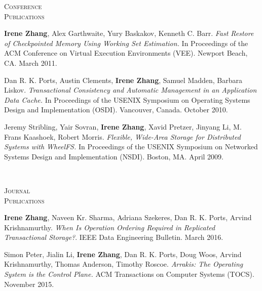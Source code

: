 \documentclass[10pt,times]{report}
\newlength{\sectiongap}
\newlength{\sectioncolwidth}
\newlength{\colgap}
\newlength{\stuffwidth}
\newenvironment{rtable}{
  \begin{minipage}{\textwidth}
  }{
  \end{minipage}
}
\newenvironment{rsection}[1]{
  \begin{minipage}[t]{\sectioncolwidth}
    \textsc{#1}
  \end{minipage}
  \hspace{\colgap}
  \begin{minipage}[t]{\stuffwidth}
  }{
    \removelastskip
  \end{minipage}
  \\[\sectiongap]
}
\begin{document}
\begin{rtable}
\begin{rsection}{Conference\\Publications}
   \textbf{Irene Zhang}, Alex Garthwaite, Yury Baskakov, Kenneth
   C. Barr. \textit{Fast Restore of Checkpointed Memory Using Working
     Set Estimation.}  In Proceedings of the ACM Conference on Virtual
   Execution Environments (VEE). Newport Beach, CA. March 2011.\\\vspace{-0.5em}

   Dan R. K. Ports, Austin Clements, \textbf{Irene Zhang}, Samuel
   Madden, Barbara Liskov. \textit{Transactional Consistency and
     Automatic Management in an Application Data Cache.}  In
   Proceedings of the USENIX Symposium on Operating Systems Design and
   Implementation (OSDI). Vancouver, Canada. October 2010.\\\vspace{-0.5em}

   Jeremy Stribling, Yair Sovran, \textbf{Irene Zhang}, Xavid Pretzer,
   Jinyang Li, M. Frans Kaashoek, Robert Morris. \textit{Flexible,
     Wide-Area Storage for Distributed Systems with WheelFS.}  In
   Proceedings of the USENIX Symposium on Networked Systems Design and
   Implementation (NSDI).  Boston, MA. April 2009. \\
  \end{rsection}

  \begin{rsection}{Journal\\Publications}
    \textbf{Irene Zhang}, Naveen Kr. Sharma, Adriana Szekeres, Dan
   R. K. Ports, Arvind Krishnamurthy. \textit{When Is Operation
     Ordering Required in Replicated Transactional Storage?}.  IEEE
   Data Engineering Bulletin. March 2016.\\\vspace{-0.5em}

   Simon Peter, Jialin Li, \textbf{Irene Zhang}, Dan R. K. Ports, Doug
   Woos, Arvind Krishnamurthy, Thomas Anderson, Timothy Roscoe.
   \textit{Arrakis: The Operating System is the Control Plane.}  ACM
   Transactions on Computer Systems (TOCS). November
   2015.\\
  \end{rsection}



\end{rtable}
\end{document}
